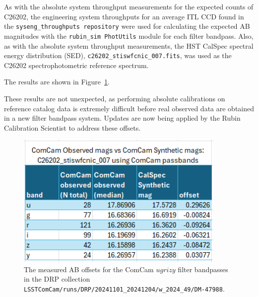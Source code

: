 As with the absolute system throughput measurements for the expected
counts of C26202, the engineering system throughputs for an average
ITL CCD found in the {\tt syseng\_throughputs repository} were used
for calculating the expected AB magnitudes with the {\tt rubin\_sim
  PhotUtils} module for each filter bandpass.  Also, as with the
absolute system throughput measurements, the HST CalSpec spectral
energy distribution (SED), {\tt c26202\_stiswfcnic\_007.fits}, was
used as the C26202 spectrophotometric reference spectrum.

The results are shown in Figure~\ref{fig:c26202_ab_offsets}.

These results are not unexpected, as performing absolute calibrations
on reference catalog data is extremely difficult before real observed
data are obtained in a new filter bandpass system.  Updates are now
being applied by the Rubin Calibration Scientist to address these
offsets.

\begin{figure}
  \begin{center}
    \includegraphics[width=0.9\textwidth]{photometric_calibration_figures/AB_offset_stiswfcnic_007.PNG}
  \end{center}
  \caption{\label{fig:c26202_ab_offsets} The measured AB offsets for
    the ComCam $ugrizy$ filter bandpasses in the DRP collection {\tt
      LSSTComCam/runs/DRP/20241101\_20241204/w\_2024\_49/DM-47988}.}
\end{figure}
